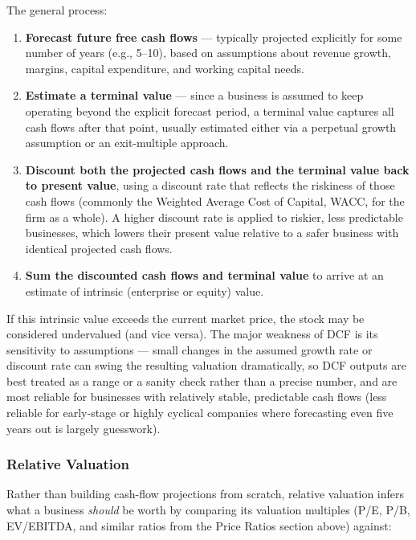 \documentclass[12pt,openany]{book}
\begin{document}
The general process:

\begin{enumerate}[leftmargin=*]
    \item \textbf{Forecast future free cash flows} --- typically projected explicitly for some number of years (e.g., 5--10), based on assumptions about revenue growth, margins, capital expenditure, and working capital needs.
    \item \textbf{Estimate a terminal value} --- since a business is assumed to keep operating beyond the explicit forecast period, a terminal value captures all cash flows after that point, usually estimated either via a perpetual growth assumption or an exit-multiple approach.
    \item \textbf{Discount both the projected cash flows and the terminal value back to present value}, using a discount rate that reflects the riskiness of those cash flows (commonly the Weighted Average Cost of Capital, WACC, for the firm as a whole). A higher discount rate is applied to riskier, less predictable businesses, which lowers their present value relative to a safer business with identical projected cash flows.
    \item \textbf{Sum the discounted cash flows and terminal value} to arrive at an estimate of intrinsic (enterprise or equity) value.
\end{enumerate}

If this intrinsic value exceeds the current market price, the stock may be considered undervalued (and vice versa). The major weakness of DCF is its sensitivity to assumptions --- small changes in the assumed growth rate or discount rate can swing the resulting valuation dramatically, so DCF outputs are best treated as a range or a sanity check rather than a precise number, and are most reliable for businesses with relatively stable, predictable cash flows (less reliable for early-stage or highly cyclical companies where forecasting even five years out is largely guesswork).

\subsubsection{Relative Valuation}

Rather than building cash-flow projections from scratch, relative valuation infers what a business \emph{should} be worth by comparing its valuation multiples (P/E, P/B, EV/EBITDA, and similar ratios from the Price Ratios section above) against:
\end{document}
